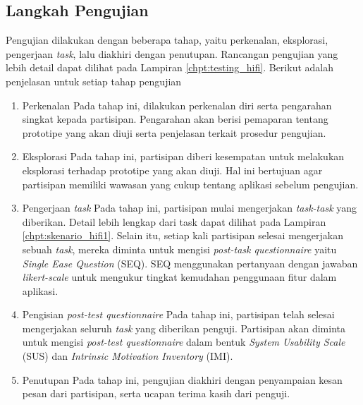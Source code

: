 \subsection{Langkah Pengujian}
\label{subsec:test_1_langkah}

Pengujian dilakukan dengan beberapa tahap, yaitu perkenalan, eksplorasi, pengerjaan \textit{task}, lalu diakhiri dengan penutupan. Rancangan pengujian yang lebih detail dapat dilihat pada Lampiran \ref{chpt:testing_hifi}. Berikut adalah penjelasan untuk setiap tahap pengujian

\begin{enumerate}
  \item Perkenalan
  \subitem Pada tahap ini, dilakukan perkenalan diri serta pengarahan singkat kepada partisipan. Pengarahan akan berisi pemaparan tentang prototipe yang akan diuji serta penjelasan terkait prosedur pengujian. 

  \item Eksplorasi
  \subitem Pada tahap ini, partisipan diberi kesempatan untuk melakukan eksplorasi terhadap prototipe yang akan diuji. Hal ini bertujuan agar partisipan memiliki wawasan yang cukup tentang aplikasi sebelum pengujian.

  \item Pengerjaan \textit{task}
  \subitem Pada tahap ini, partisipan mulai mengerjakan \textit{task-task} yang diberikan. Detail lebih lengkap dari task dapat dilihat pada Lampiran \ref{chpt:skenario_hifi1}. Selain itu, setiap kali partisipan selesai mengerjakan sebuah \textit{task}, mereka diminta untuk mengisi \textit{post-task questionnaire} yaitu \textit{Single Ease Question} (SEQ). SEQ menggunakan pertanyaan dengan jawaban \textit{likert-scale} untuk mengukur tingkat kemudahan penggunaan fitur dalam aplikasi.

  \item Pengisian \textit{post-test questionnaire}
  \subitem Pada tahap ini, partisipan telah selesai mengerjakan seluruh \textit{task} yang diberikan penguji. Partisipan akan diminta untuk mengisi \textit{post-test questionnaire} dalam bentuk \textit{System Usability Scale} (SUS) dan \textit{Intrinsic Motivation Inventory} (IMI). 

  \item Penutupan
  \subitem Pada tahap ini, pengujian diakhiri dengan penyampaian kesan pesan dari partisipan, serta ucapan terima kasih dari penguji. 

\end{enumerate}



